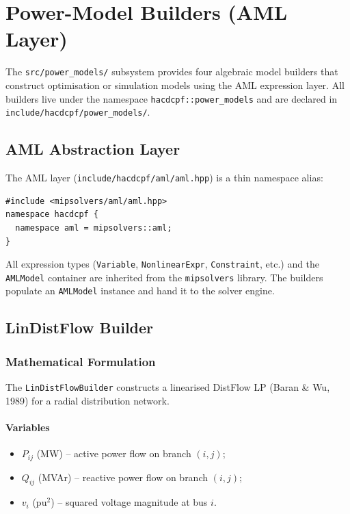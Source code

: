 \section{Power-Model Builders (AML Layer)}
\label{sec:power-models}

The \texttt{src/power\_models/} subsystem provides four algebraic model
builders that construct optimisation or simulation models using the AML
expression layer.  All builders live under the namespace
\texttt{hacdcpf::power\_models} and are declared in
\texttt{include/hacdcpf/power\_models/}.

\subsection{AML Abstraction Layer}
\label{sec:aml}

The AML layer (\texttt{include/hacdcpf/aml/aml.hpp}) is a thin namespace
alias:
\begin{verbatim}
#include <mipsolvers/aml/aml.hpp>
namespace hacdcpf {
  namespace aml = mipsolvers::aml;
}
\end{verbatim}
All expression types (\texttt{Variable}, \texttt{NonlinearExpr},
\texttt{Constraint}, etc.) and the \texttt{AMLModel} container are inherited
from the \texttt{mipsolvers} library.  The builders populate an
\texttt{AMLModel} instance and hand it to the solver engine.

\subsection{LinDistFlow Builder}
\label{sec:lindistflow}

\subsubsection{Mathematical Formulation}

The \texttt{LinDistFlowBuilder} constructs a linearised DistFlow LP
(Baran \& Wu, 1989) for a radial distribution network.

\paragraph{Variables}
\begin{itemize}
  \item $P_{ij}$ (MW) -- active power flow on branch $(i,j)$;
  \item $Q_{ij}$ (MVAr) -- reactive power flow on branch $(i,j)$;
  \item $v_i$ (pu$^2$) -- squared voltage magnitude at bus $i$.
\end{itemize}

